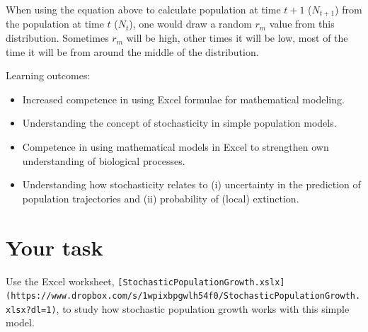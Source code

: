\documentclass[
  a4paper]{book}
\providecommand{\tightlist}{%
  \setlength{\itemsep}{0pt}\setlength{\parskip}{0pt}}
\begin{document}
When using the equation above to calculate population at time \(t+1\) (\(N_{t+1}\)) from the population at time \(t\) (\(N_t\)), one would draw a random \(r_m\) value from this distribution. Sometimes \(r_m\) will be high, other times it will be low, most of the time it will be from around the middle of the distribution.

\begin{do-something}
Learning outcomes:

\begin{itemize}
\tightlist
\item
  Increased competence in using Excel formulae for mathematical
  modeling.
\item
  Understanding the concept of stochasticity in simple population
  models.
\item
  Competence in using mathematical models in Excel to strengthen own
  understanding of biological processes.
\item
  Understanding how stochasticity relates to (i) uncertainty in the
  prediction of population trajectories and (ii) probability of (local)
  extinction.
\end{itemize}
\end{do-something}

\hypertarget{your-task-2}{%
\section{Your task}\label{your-task-2}}

\begin{do-something}
Use the Excel worksheet,
\texttt{{[}StochasticPopulationGrowth.xslx{]}(https://www.dropbox.com/s/1wpixbpgwlh54f0/StochasticPopulationGrowth.xlsx?dl=1)},
to study how stochastic population growth works with this simple model.
\end{do-something}
\end{document}
